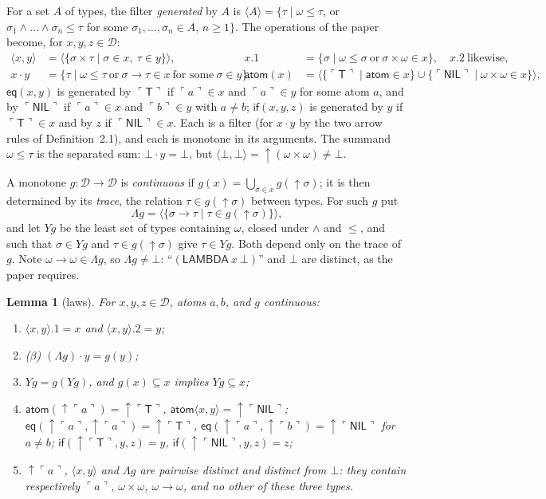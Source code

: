 \documentclass[11pt]{amsart}
\newtheorem{lemma}[theorem]{Lemma}
\theoremstyle{definition}
\theoremstyle{remark}
\newcommand{\kw}[1]{\mathsf{#1}}
\newcommand{\at}[1]{\ulcorner #1\urcorner}
\newcommand{\Atom}{\mathsf{atom}}
\newcommand{\T}{\mathsf{T}}
\newcommand{\NIL}{\mathsf{NIL}}
\newcommand{\D}{\mathcal D}
\newcommand{\up}{{\uparrow}}
\begin{document}
For a set $A$ of types, the filter \emph{generated} by $A$ is
$\langle A\rangle=\{\tau\mid\omega\le\tau$, or
$\sigma_1\wedge\dots\wedge\sigma_n\le\tau$ for some
$\sigma_1,\dots,\sigma_n\in A$, $n\ge1\}$.
The operations of the paper become, for $x,y,z\in\D$:
\[
\begin{aligned}
\langle x,y\rangle&=\langle\{\sigma\times\tau\mid\sigma\in x,\ \tau\in y\}\rangle, &
x.1&=\{\sigma\mid\omega\le\sigma\ \text{or}\ \sigma\times\omega\in x\},\quad
x.2\ \text{likewise},\\
x\cdot y&=\{\tau\mid\omega\le\tau\ \text{or}\ \sigma\to\tau\in x\ \text{for some}\ \sigma\in y\}, &
\kw{atom}(x)&=\langle\{\at\T\mid\Atom\in x\}\cup\{\at\NIL\mid\omega\times\omega\in x\}\rangle,
\end{aligned}
\]
$\kw{eq}(x,y)$ is generated by $\at\T$ if $\at a\in x$ and $\at a\in y$ for
some atom $a$, and by $\at\NIL$ if $\at a\in x$ and $\at b\in y$ with
$a\ne b$; $\kw{if}(x,y,z)$ is generated by $y$ if $\at\T\in x$ and by $z$ if
$\at\NIL\in x$. Each is a filter (for $x\cdot y$ by the two arrow rules of
Definition~2.1), and each is monotone in its arguments. The summand
$\omega\le\tau$ is the separated sum: $\bot\cdot y=\bot$, but
$\langle\bot,\bot\rangle=\up(\omega\times\omega)\ne\bot$.

A monotone $g:\D\to\D$ is \emph{continuous} if
$g(x)=\bigcup_{\sigma\in x}g(\up\sigma)$; it is then determined by its
\emph{trace}, the relation $\tau\in g(\up\sigma)$ between types. For such
$g$ put
\[
\Lambda g=\langle\{\sigma\to\tau\mid\tau\in g(\up\sigma)\}\rangle,
\]
and let $Yg$ be the least set of types containing $\omega$, closed under
$\wedge$ and $\le$, and such that $\sigma\in Yg$ and $\tau\in g(\up\sigma)$
give $\tau\in Yg$. Both depend only on the trace of $g$. Note
$\omega\to\omega\in\Lambda g$, so $\Lambda g\ne\bot$: ``$(\kw{LAMBDA}\ x\ \bot)$''
and $\bot$ are distinct, as the paper requires.

\begin{lemma}[laws]\label{lem:laws}
For $x,y,z\in\D$, atoms $a,b$, and $g$ continuous:
\begin{enumerate}
\item $\langle x,y\rangle.1=x$ and $\langle x,y\rangle.2=y$;
\item ($\beta$) $(\Lambda g)\cdot y=g(y)$;
\item $Yg=g(Yg)$, and $g(x)\subseteq x$ implies $Yg\subseteq x$;
\item $\kw{atom}(\up\at a)=\up\at\T$, $\kw{atom}\langle x,y\rangle=\up\at\NIL$;
$\kw{eq}(\up\at a,\up\at a)=\up\at\T$, $\kw{eq}(\up\at a,\up\at b)=\up\at\NIL$
for $a\ne b$; $\kw{if}(\up\at\T,y,z)=y$, $\kw{if}(\up\at\NIL,y,z)=z$;
\item $\up\at a$, $\langle x,y\rangle$ and $\Lambda g$ are pairwise distinct
and distinct from $\bot$: they contain respectively $\at a$, $\omega\times\omega$,
$\omega\to\omega$, and no other of these three types.
\end{enumerate}
\end{lemma}
\end{document}
